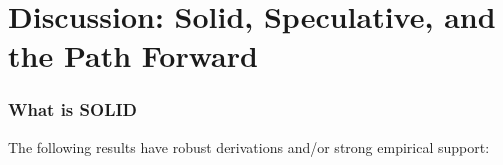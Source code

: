 \documentclass[11pt,a4paper]{article}
\begin{document}
\newpage


\part{Discussion: Solid, Speculative, and the Path Forward}

\section{What is SOLID}
\label{sec:what_solid}

The following results have robust derivations and/or strong empirical support:
\end{document}
